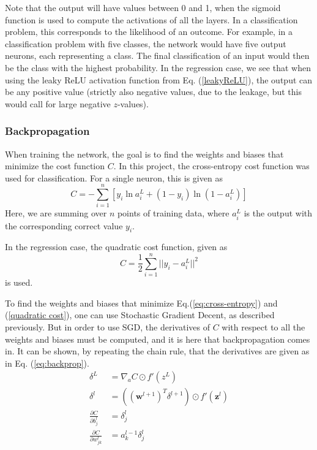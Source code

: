 Note that the output will have values between 0 and 1, when the sigmoid function is used to compute the activations of all the layers. In a classification problem, this corresponds to the likelihood of an outcome. For example, in a classification problem with five classes, the network would have five output neurons, each representing a class. The final classification of an input would then be the class with the highest probability.
In the regression case, we see that when using the leaky ReLU activation function from Eq. (\ref{leakyReLU}), the output can be any positive value (strictly also negative values, due to the leakage, but this would call for large negative $z$-values).

\subsubsection*{Backpropagation}
When training the network, the goal is to find the weights and biases that minimize the cost function $C$. In this project, the cross-entropy cost function was used for classification. For a single neuron, this is given as
\begin{equation}\label{eq:cross-entropy}
	C = -\sum_{i=1}^n\left[y_i\ln a^L_i + (1-y_i)\ln(1-a^L_i)\right]
\end{equation}
Here, we are summing over $n$ points of training data, where $a_i^L$ is the output with the corresponding correct value $y_i$.

In the regression case, the quadratic cost function, given as
\begin{equation}\label{quadratic cost}
  C = \frac{1}{2}\sum_{i=1}^n||y_i-a_i^L||^2
\end{equation}
is used.

To find the weights and biases that minimize Eq.(\ref{eq:cross-entropy}) and (\ref{quadratic cost}), one can use Stochastic Gradient Decent, as described previously. But in order to use SGD, the derivatives of $C$ with respect to all the weights and biases must be computed, and it is here that backpropagation comes in. It can be shown, by repeating the chain rule, that the derivatives are given as in Eq. (\ref{eq:backprop}).
\begin{equation}\label{eq:backprop}
\begin{aligned}
	\delta^L &= \nabla_aC\odot f'(z^L)\\
	\delta^l &= ((\boldsymbol{w}^{l+1})^T\delta^{l+1})\odot f'(\boldsymbol{z}^l) \\
	\frac{\partial C}{\partial b^l_j} &= \delta_j^l \\
	\frac{\partial C}{\partial w_{jk}^l} &= a_k^{l-1}\delta^l_j
\end{aligned}
\end{equation}

